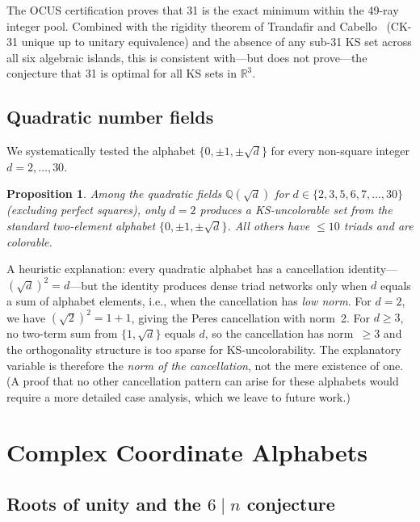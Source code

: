 \documentclass[12pt,a4paper]{article}
\newtheorem{proposition}[theorem]{Proposition}
\newcommand{\R}{\mathbb{R}}
\newcommand{\Q}{\mathbb{Q}}
\begin{document}
The OCUS certification proves that 31 is the exact minimum within the 49-ray integer pool.  Combined with the rigidity theorem of Trandafir and Cabello~\cite{TrandafirCabello2025} (CK-31 unique up to unitary equivalence) and the absence of any sub-31 KS set across all six algebraic islands, this is consistent with---but does not prove---the conjecture that 31 is optimal for all KS sets in $\R^3$.

\subsection{Quadratic number fields}\label{sec:quadratic}

We systematically tested the alphabet $\{0, \pm 1, \pm\sqrt{d}\}$ for every non-square integer $d = 2, \ldots, 30$.

\begin{proposition}\label{prop:quadratic}
Among the quadratic fields $\Q(\sqrt{d})$ for $d \in \{2, 3, 5, 6, 7, \ldots, 30\}$ (excluding perfect squares), only $d = 2$ produces a KS-uncolorable set from the standard two-element alphabet $\{0, \pm 1, \pm\sqrt{d}\}$. All others have $\leq 10$ triads and are colorable.
\end{proposition}

A heuristic explanation: every quadratic alphabet has a cancellation identity---$(\sqrt{d})^2 = d$---but the identity produces dense triad networks only when $d$ equals a sum of alphabet elements, i.e., when the cancellation has \emph{low norm}.  For $d = 2$, we have $(\sqrt{2})^2 = 1 + 1$, giving the Peres cancellation with norm~2.  For $d \geq 3$, no two-term sum from $\{1, \sqrt{d}\}$ equals $d$, so the cancellation has norm~$\geq 3$ and the orthogonality structure is too sparse for KS-uncolorability.  The explanatory variable is therefore the \emph{norm of the cancellation}, not the mere existence of one.  (A proof that no other cancellation pattern can arise for these alphabets would require a more detailed case analysis, which we leave to future work.)

\section{Complex Coordinate Alphabets}\label{sec:complex}

\subsection{Roots of unity and the $6 \mid n$ conjecture}\label{sec:roots}
\end{document}
